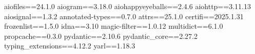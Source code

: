aiofiles==24.1.0
aiogram==3.18.0
aiohappyeyeballs==2.4.6
aiohttp==3.11.13
aiosignal==1.3.2
annotated-types==0.7.0
attrs==25.1.0
certifi==2025.1.31
frozenlist==1.5.0
idna==3.10
magic-filter==1.0.12
multidict==6.1.0
propcache==0.3.0
pydantic==2.10.6
pydantic_core==2.27.2
typing_extensions==4.12.2
yarl==1.18.3
